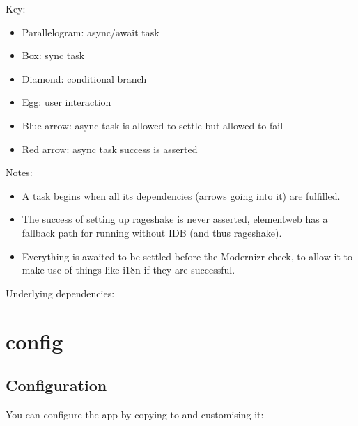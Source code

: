 \documentclass[letterpaper,10pt,openany,oneside,english]{sphinxmanual}
\begin{document}
\sphinxAtStartPar
Key:
\begin{itemize}
\item {} 
\sphinxAtStartPar
Parallelogram: async/await task

\item {} 
\sphinxAtStartPar
Box: sync task

\item {} 
\sphinxAtStartPar
Diamond: conditional branch

\item {} 
\sphinxAtStartPar
Egg: user interaction

\item {} 
\sphinxAtStartPar
Blue arrow: async task is allowed to settle but allowed to fail

\item {} 
\sphinxAtStartPar
Red arrow: async task success is asserted

\end{itemize}

\sphinxAtStartPar
Notes:
\begin{itemize}
\item {} 
\sphinxAtStartPar
A task begins when all its dependencies (arrows going into it) are fulfilled.

\item {} 
\sphinxAtStartPar
The success of setting up rageshake is never asserted, element\sphinxhyphen{}web has a fallback path for running without IDB (and thus rageshake).

\item {} 
\sphinxAtStartPar
Everything is awaited to be settled before the Modernizr check, to allow it to make use of things like i18n if they are successful.

\end{itemize}

\sphinxAtStartPar
Underlying dependencies:



\chapter{config}
\label{\detokenize{config:config}}\label{\detokenize{config::doc}}

\section{Configuration}
\label{\detokenize{config:configuration}}
\sphinxAtStartPar
You can configure the app by copying  to
 and customising it:
\end{document}
